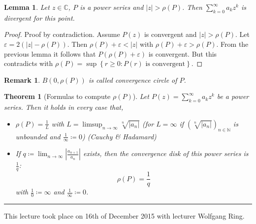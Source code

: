 \documentclass[a4paper,landscape,twocolumn]{article}
\newtheorem{theorem}{Theorem}
\newtheorem{rem}{Remark}
\newtheorem{lemma}{Lemma}
\newcommand\set[1]{\left\{#1\right\}}
\newcommand\abs[1]{\left|#1\right|}
\newcommand\seq[1]{{\left(#1\right)}_{n \in \mathbb N}}
\newcommand\meta[3]{\hrule{} This #1 took place on #2 with lecturer #3.\par}
\begin{document}
\begin{lemma}
  Let $z \in \mathbb C$, $P$ is a power series and $\abs{z} > \rho(P)$.
  Then $\sum_{k=0}^\infty a_k z^k$ is divergent for this point.
\end{lemma}
\begin{proof}
  Proof by contradiction. Assume $P(z)$ is convergent and $\abs{z} > \rho(P)$.
  Let $\varepsilon = 2(\abs{z} - \rho(P))$. Then $\rho(P) + \varepsilon < \abs{z}$
  with $\rho(P) + \varepsilon > \rho(P)$. From the previous lemma it follows that
  $P(\rho(P) + \varepsilon)$ is convergent. But this contradicts with $\rho(P)
  = \sup\set{r \geq 0: P(r) \text{ is convergent}}$.
\end{proof}
\begin{rem}
  $B(0,\rho(P))$ is called \emph{convergence circle of $P$}.
\end{rem}
\begin{theorem}[Formulas to compute $\rho(P)$]
  Let $P(z) = \sum_{k=0}^\infty a_k z^k$ be a power series.
  Then it holds in every case that,
  \begin{itemize}
    \item $\rho(P) = \frac{1}{L}$ with $L = \limsup_{n\to\infty} \sqrt[n]{\abs{a_n}}$
      (for $L = \infty$ if $\seq{\sqrt[n]{\abs{a_n}}}$ is unbounded and $\frac{1}{\infty} \coloneqq 0$)
      (Cauchy \& Hadamard)
    \item
      If $q \coloneqq \lim_{n\to\infty} \abs{\frac{a_{n+1}}{a_n}}$ exists,
      then the convergence disk of this power series is $\frac1q$:
      \[ \rho(P) = \frac{1}{q} \]
      with $\frac10 \coloneqq \infty$ and $\frac1{\infty} \coloneqq 0$.
  \end{itemize}
\end{theorem}

\meta{lecture}{16th of December 2015}{Wolfgang Ring}
\end{document}

